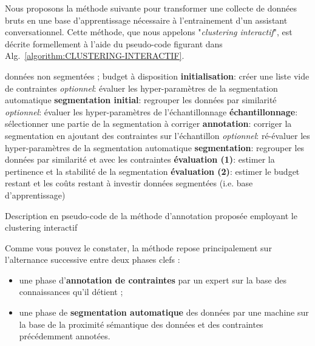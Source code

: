 		Nous proposons la méthode suivante pour transformer une collecte de données bruts en une base d'apprentissage nécessaire à l'entrainement d'un assistant conversationnel. Cette méthode, que nous appelons "\textit{clustering interactif}", est décrite formellement à l'aide du pseudo-code figurant  dans Alg.~\ref{algorithm:CLUSTERING-INTERACTIF}.

		\begin{algorithm}
		    \begin{algorithmic}[1]
		        \Require données non segmentées ; budget à disposition
				\State \textbf{initialisation}: créer une liste vide de contraintes
		        \State \textit{optionnel}: évaluer les hyper-paramètres de la segmentation automatique
		        \State \textbf{segmentation initial}: regrouper les données par similarité
		        \Repeat
		            \State \textit{optionnel}: évaluer les hyper-paramètres de l'échantillonnage
		            \State \textbf{échantillonnage}: sélectionner une partie de la segmentation à corriger
		            \State \textbf{annotation}: corriger la segmentation en ajoutant des contraintes sur l'échantillon
		            \State \textit{optionnel}: ré-évaluer les hyper-paramètres de la segmentation automatique
			        \State \textbf{segmentation}: regrouper les données par similarité et avec les contraintes
			        \State \textbf{évaluation (1)}: estimer la pertinence et la stabilité de la segmentation
			        \State \textbf{évaluation (2)}: estimer le budget restant et les coûts restant à investir
		        \Ensure données segmentées (i.e. base d'apprentissage)
		    \end{algorithmic}
		    \caption{Description en pseudo-code de la méthode d'annotation proposée employant le clustering interactif}
		    \label{algorithm:CLUSTERING-INTERACTIF}
		\end{algorithm}
		
		Comme vous pouvez le constater, la méthode repose principalement sur l'alternance successive entre deux phases clefs :
		\begin{itemize}
			\item une phase d'\textbf{annotation de contraintes}
			par un expert sur la base des connaissances qu'il détient ;
			\item une phase de \textbf{segmentation automatique} des données
			par une machine sur la base de la proximité sémantique des données et des contraintes précédemment annotées.
		\end{itemize}
		
